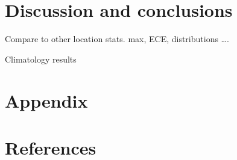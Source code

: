\documentclass[
]{article}
\begin{document}
\FloatBarrier

\hypertarget{discussion-and-conclusions}{%
\section{Discussion and conclusions}\label{discussion-and-conclusions}}

Compare to other location stats.
max, ECE, distributions \ldots.

Climatology results

\hypertarget{appendix}{%
\section*{Appendix}\label{appendix}}

\hypertarget{references}{%
\section*{References}\label{references}}
\end{document}
